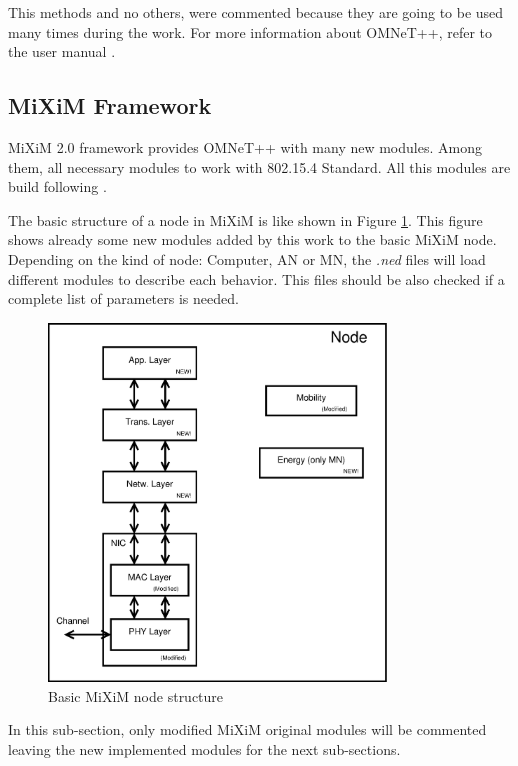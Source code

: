 This methods and no others, were commented because they are going to be used many times during the work. For more information about \ac{OMNeT++}, 
refer to the user manual \cite{manualomnet}.

\subsection{\ac{MiXiM} Framework}

\ac{MiXiM} 2.0 framework provides \ac{OMNeT++} with many new modules. Among them, all necessary modules to work with 802.15.4 Standard. 
All this modules are build following \cite{IEEE802.15.4-2006}.

The basic structure of a node in \ac{MiXiM} is like shown in Figure \ref{fig:miximmodule}. This figure shows already some new modules added by
this work to the basic \ac{MiXiM} node. Depending on the kind of node: Computer, \ac{AN} or \ac{MN}, the \textit{.ned} files will load 
different modules to describe each behavior. This files should be also checked if a complete list of parameters is needed.

\begin{figure}[ht]
 \begin{center}
  \includegraphics[width=0.8\textwidth]{miximmodule.eps}
 \end{center}
 \caption{Basic \ac{MiXiM} node structure}
 \label{fig:miximmodule}
\end{figure}

In this sub-section, only modified \ac{MiXiM} original modules will be commented leaving the new implemented modules for the next sub-sections.

